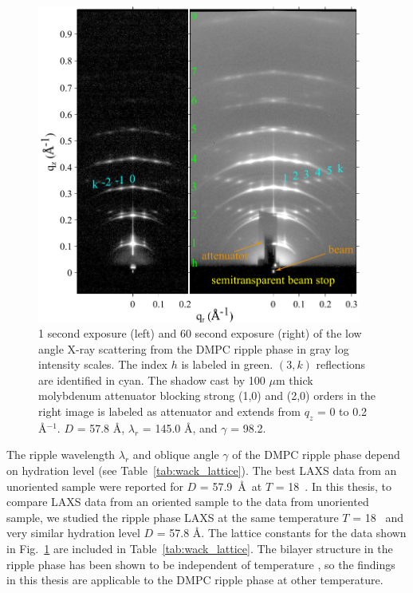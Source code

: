 \begin{figure}[htbp]
  \centering
  \includegraphics[width=0.95\textwidth]{figures/ripple/ripple083and085}
  \caption{1 second exposure (left) and 60 second exposure (right) of the low
  angle X-ray scattering from the DMPC ripple phase in gray log intensity scales. 
  The index $h$ is 
  labeled in green. $(3,k)$ reflections are identified in cyan. 
  The shadow cast by 100 $\mu$m thick molybdenum attenuator blocking
  strong (1,0) and (2,0) orders in the right image is labeled as attenuator
  and extends from $q_z$ = 0 to 0.2 \AA$^{-1}$.
  $D$ = 57.8 \AA, $\lambda_r$ = 145.0 \AA, and $\gamma$ = 98.2\textdegree.}
  \label{fig:ripple_laxs_images}  
\end{figure} 

The ripple wavelength $\lambda_r$ and oblique angle $\gamma$ of the DMPC
ripple phase depend on hydration level \cite{ref:Wack89} 
(see Table~\ref{tab:wack_lattice}).
The best LAXS data from an unoriented sample were reported for $D$ = 57.9~\AA\ 
at $T$ = 18~\textcelsius. In this thesis, 
to compare LAXS data from an oriented sample to the data from unoriented sample,
we studied the ripple phase LAXS at the same temperature $T$ = 18 \textcelsius\ 
and very similar hydration level $D$ = 57.8 \AA.
The lattice constants for the data shown in Fig.~\ref{fig:ripple_laxs_images} are 
included in Table~\ref{tab:wack_lattice}.
The bilayer structure in the ripple phase has been shown to be independent 
of temperature \cite{ref:Sengupta03}, so the findings in this thesis are
applicable to the DMPC ripple phase at other temperature.

